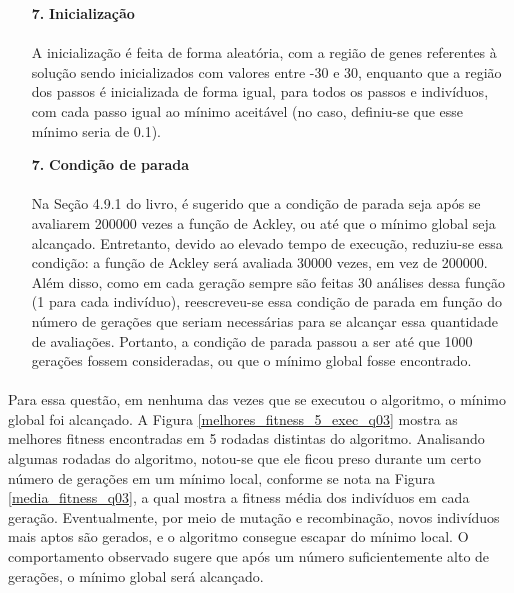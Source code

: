 \documentclass{report}
\begin{document}
\begin{itemize}
		\item[\textbf{7.}] \textbf{Inicialização}
		
		\paragraph{} A inicialização é feita de forma aleatória, com a região de genes referentes à solução sendo inicializados com valores entre -30 e 30, enquanto que a região dos passos é inicializada de forma igual, para todos os passos e indivíduos, com cada passo igual ao mínimo aceitável (no caso, definiu-se que esse mínimo seria de 0.1).\\		
		
		\item[\textbf{7.}] \textbf{Condição de parada}
		
		\paragraph{} Na Seção 4.9.1 do livro, é sugerido que a condição de parada seja após se avaliarem 200000 vezes a função de Ackley, ou até que o mínimo global seja alcançado. Entretanto, devido ao elevado tempo de execução, reduziu-se essa condição: a função de Ackley será avaliada 30000 vezes, em vez de 200000. Além disso, como em cada geração sempre são feitas 30 análises dessa função (1 para cada indivíduo), reescreveu-se essa condição de parada em função do número de gerações que seriam necessárias para se alcançar essa quantidade de avaliações. Portanto, a condição de parada passou a ser até que 1000 gerações fossem consideradas, ou que o mínimo global fosse encontrado.\\
	\end{itemize}
	
	\paragraph{} Para essa questão, em nenhuma das vezes que se executou o algoritmo, o mínimo global foi alcançado. A Figura \ref{melhores_fitness_5_exec_q03} mostra as melhores fitness encontradas em 5 rodadas distintas do algoritmo. Analisando algumas rodadas do algoritmo, notou-se que ele ficou preso durante um certo número de gerações em um mínimo local, conforme se nota na Figura \ref{media_fitness_q03}, a qual mostra a fitness média dos indivíduos em cada geração. Eventualmente, por meio de mutação e recombinação, novos indivíduos mais aptos são gerados, e o algoritmo consegue escapar do mínimo local. O comportamento observado sugere que após um número suficientemente alto de gerações, o mínimo global será alcançado.\\
	
\end{document}
